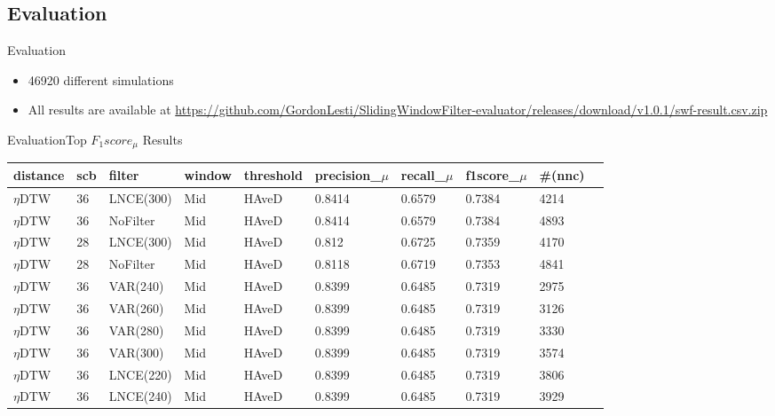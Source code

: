 \subsection{Evaluation}

\begin{frame}{Evaluation}
    \begin{itemize}
        \item 46920 different simulations
        
        \item All results are available at \url{https://github.com/GordonLesti/SlidingWindowFilter-evaluator/releases/download/v1.0.1/swf-result.csv.zip}
    \end{itemize}
\end{frame}

\begin{frame}{Evaluation}{Top $F_{1}score_{\mu}$ Results}
    \begin{center}
        \tiny
        \begin{tabular}{llllllllll}
            \textbf{distance} & \textbf{scb} & \textbf{filter} & \textbf{window} & \textbf{threshold} & \textbf{precision\_$\mu$} & \textbf{recall\_$\mu$} & \textbf{f1score\_$\mu$} & \textbf{\#(nnc)}\\
            \hline
            $\eta$DTW & 36 & LNCE(300) & Mid  & HAveD & 0.8414 & 0.6579 & 0.7384 & 4214\\
            $\eta$DTW & 36 & NoFilter & Mid  & HAveD & 0.8414 & 0.6579 & 0.7384 & 4893\\
            $\eta$DTW & 28 & LNCE(300) & Mid  & HAveD & 0.812 & 0.6725 & 0.7359 & 4170\\
            $\eta$DTW & 28 & NoFilter & Mid  & HAveD & 0.8118 & 0.6719 & 0.7353 & 4841\\
            $\eta$DTW & 36 & VAR(240) & Mid  & HAveD & 0.8399 & 0.6485 & 0.7319 & 2975\\
            $\eta$DTW & 36 & VAR(260) & Mid & HAveD & 0.8399 & 0.6485 & 0.7319 & 3126\\
            $\eta$DTW & 36 & VAR(280) & Mid & HAveD & 0.8399 & 0.6485 & 0.7319 & 3330\\
            $\eta$DTW & 36 & VAR(300) & Mid & HAveD & 0.8399 & 0.6485 & 0.7319 & 3574\\
            $\eta$DTW & 36 & LNCE(220) & Mid & HAveD & 0.8399 & 0.6485 & 0.7319 & 3806\\
            $\eta$DTW & 36 & LNCE(240) & Mid & HAveD & 0.8399 & 0.6485 & 0.7319 & 3929
        \end{tabular}
    \end{center}
\end{frame}

